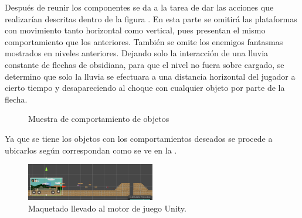 Después de reunir los componentes se da a la tarea de dar las acciones que realizarían descritas dentro de la figura \cite{fig:n703}. En esta parte se omitirá las plataformas con movimiento tanto horizontal como vertical, pues presentan el mismo comportamiento que los anteriores. También se omite los enemigos fantasmas mostrados en niveles anteriores. Dejando solo la interacción de una lluvia constante de flechas de obsidiana, para que el nivel no fuera sobre cargado, se determino que solo la lluvia se efectuara a una distancia horizontal del jugador a cierto tiempo y desapareciendo al choque con cualquier objeto por parte de la flecha.
\begin{figure}[htbp]
	\centering
	\caption{Muestra de comportamiento de objetos} \label{fig:n703}
\end{figure}

Ya que se tiene los objetos con los comportamientos deseados se procede a ubicarlos según correspondan como se ve en la \cite{fig:n704}.
\begin{figure}
	\centering
	\caption{Maquetado llevado al motor de juego Unity.}
	\label{fig:n704}
	\includegraphics[width=0.5\textwidth]{03TrabajoRealizado/DocProduccionR/imagenes/n7/n701.png}
\end{figure}

